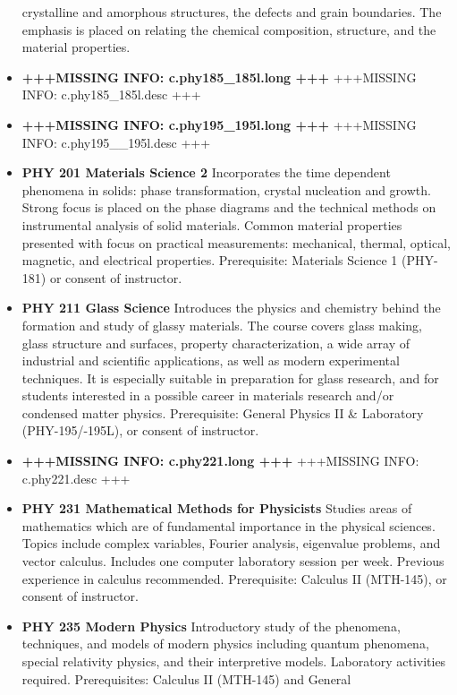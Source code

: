 \documentclass[
  letterpaper,
]{scrbook}
\begin{document}
\begin{itemize}
  crystalline and amorphous structures, the defects and grain
  boundaries. The emphasis is placed on relating the chemical
  composition, structure, and the material properties.
\item
  \textbf{+++MISSING INFO: c.phy185\_185l.long +++} +++MISSING INFO:
  c.phy185\_185l.desc +++\\
\item
  \textbf{+++MISSING INFO: c.phy195\_195l.long +++} +++MISSING INFO:
  c.phy195\_\_195l.desc +++
\item
  \textbf{PHY 201 Materials Science 2} Incorporates the time dependent
  phenomena in solids: phase transformation, crystal nucleation and
  growth. Strong focus is placed on the phase diagrams and the technical
  methods on instrumental analysis of solid materials. Common material
  properties presented with focus on practical measurements: mechanical,
  thermal, optical, magnetic, and electrical properties. Prerequisite:
  Materials Science 1 (PHY-181) or consent of instructor.
\item
  \textbf{PHY 211 Glass Science} Introduces the physics and chemistry
  behind the formation and study of glassy materials. The course covers
  glass making, glass structure and surfaces, property characterization,
  a wide array of industrial and scientific applications, as well as
  modern experimental techniques. It is especially suitable in
  preparation for glass research, and for students interested in a
  possible career in materials research and/or condensed matter physics.
  Prerequisite: General Physics II \& Laboratory (PHY-195/-195L), or
  consent of instructor.
\item
  \textbf{+++MISSING INFO: c.phy221.long +++} +++MISSING INFO:
  c.phy221.desc +++\\
\item
  \textbf{PHY 231 Mathematical Methods for Physicists} Studies areas of
  mathematics which are of fundamental importance in the physical
  sciences. Topics include complex variables, Fourier analysis,
  eigenvalue problems, and vector calculus. Includes one computer
  laboratory session per week. Previous experience in calculus
  recommended. Prerequisite: Calculus II (MTH-145), or consent of
  instructor.
\item
  \textbf{PHY 235 Modern Physics} Introductory study of the phenomena,
  techniques, and models of modern physics including quantum phenomena,
  special relativity physics, and their interpretive models. Laboratory
  activities required. Prerequisites: Calculus II (MTH-145) and General

\end{itemize}
\end{document}
